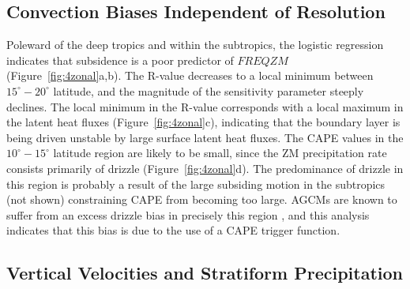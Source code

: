 \documentclass[times]{qjrms4}
\begin{document}
\subsection{Convection Biases Independent of Resolution}

Poleward of the deep tropics and within the subtropics, the logistic regression indicates that subsidence is a poor predictor of $FREQZM$ (Figure~\ref{fig:4zonal}a,b). The R-value decreases to a local minimum between $15^{\circ} - 20^{\circ}$ latitude, and the magnitude of the sensitivity parameter steeply declines. The local minimum in the R-value corresponds with a local maximum in the latent heat fluxes (Figure~\ref{fig:4zonal}c), indicating that the boundary layer is being driven unstable by large surface latent heat fluxes. The CAPE values in the $10^{\circ} - 15^{\circ}$ latitude region are likely to be small, since the ZM precipitation rate consists primarily of drizzle (Figure~\ref{fig:4zonal}d). The predominance of drizzle in this region is probably a result of the large subsiding motion in the subtropics (not shown) constraining CAPE from becoming too large. AGCMs are known to suffer from an excess drizzle bias in precisely this region \citep{D2006JCLIM}, and this analysis indicates that this bias is due to the use of a CAPE trigger function.

\subsection{Vertical Velocities and Stratiform Precipitation}
\end{document}
